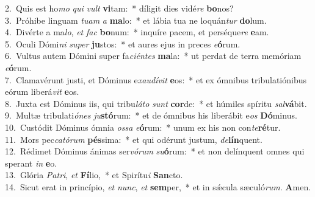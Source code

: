 {2.~}Quis est ho\textit{mo} \textit{qui} \textit{vult} \textbf{vi}tam:~* díligit dies vidé\textit{re} \textbf{bo}nos?\\
{3.~}Próhibe linguam \textit{tu}\textit{am} \textit{a} \textbf{ma}lo:~* et lábia tua ne loquán\textit{tur} \textbf{do}lum.\\
{4.~}Divérte a ma\textit{lo}, \textit{et} \textit{fac} \textbf{bo}num:~* inquíre pacem, et perséque\textit{re} \textbf{e}am.\\
{5.~}Oculi Dómi\textit{ni} \textit{su}\textit{per} \textbf{ju}stos:~* et aures ejus in preces \textit{e}\textbf{ó}rum.\\
{6.~}Vultus autem Dómini super fa\textit{ci}\textit{én}\textit{tes} \textbf{ma}la:~* ut perdat de terra memóriam \textit{e}\textbf{ó}rum.\\
{7.~}Clamavérunt justi, et Dóminus e\textit{xau}\textit{dí}\textit{vit} \textbf{e}os:~* et ex ómnibus tribulatiónibus eórum liberá\textit{vit} \textbf{e}os.\\
{8.~}Juxta est Dóminus iis, qui tribu\textit{lá}\textit{to} \textit{sunt} \textbf{cor}de:~* et húmiles spíritu \textit{sal}\textbf{vá}bit.\\
{9.~}Multæ tribulati\textit{ó}\textit{nes} \textit{ju}\textbf{stó}rum:~* et de ómnibus his liberábit e\textit{os} \textbf{Dó}minus.\\
{10.~}Custódit Dóminus ómnia \textit{os}\textit{sa} \textit{e}\textbf{ó}rum:~* unum ex his non con\textit{te}\textbf{ré}tur.\\
{11.~}Mors pec\textit{ca}\textit{tó}\textit{rum} \textbf{pés}sima:~* et qui odérunt justum, \textit{de}\textbf{lín}quent.\\
{12.~}Rédimet Dóminus ánimas ser\textit{vó}\textit{rum} \textit{su}\textbf{ó}rum:~* et non delínquent omnes qui sperant \textit{in} \textbf{e}o.\\
{13.~}Glória \textit{Pa}\textit{tri}, \textit{et} \textbf{Fí}lio,~* et Spirítu\textit{i} \textbf{San}cto.\\
{14.~}Sicut erat in princípio, \textit{et} \textit{nunc}, \textit{et} \textbf{sem}per,~* et in sǽcula sæculó\textit{rum}. \textbf{A}men.\\
